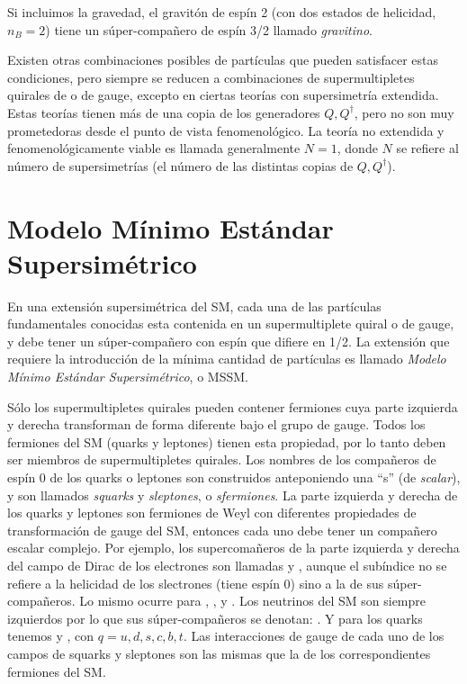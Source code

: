 Si incluimos la gravedad, el gravitón de espín 2 (con dos estados de helicidad,
$n_B=2$) tiene un súper-compañero de espín 3/2 llamado \emph{gravitino}.

Existen otras combinaciones posibles de partículas que pueden satisfacer estas
condiciones, pero siempre se reducen a combinaciones de supermultipletes
quirales de o de gauge, excepto en ciertas teorías con supersimetría extendida.
Estas teorías tienen más de una copia de los generadores $Q, Q^\dagger$, pero no
son muy prometedoras desde el punto de vista fenomenológico. La teoría no
extendida y fenomenológicamente viable es llamada generalmente $N=1$, donde $N$
se refiere al número de supersimetrías (el número de las distintas copias de
$Q,Q^\dagger$).


\section{Modelo Mínimo Estándar Supersimétrico}

En una extensión supersimétrica del SM, cada una de las partículas fundamentales
conocidas esta contenida en un supermultiplete quiral o de gauge, y debe tener
un súper-compa\~nero con espín que difiere en 1/2. La extensión que requiere la
introducción de la mínima cantidad de partículas es llamado \emph{Modelo Mínimo
  Estándar Supersimétrico}, o MSSM.


Sólo los supermultipletes quirales pueden contener fermiones cuya parte
izquierda y derecha transforman de forma diferente bajo el grupo de gauge. Todos
los fermiones del SM (quarks y leptones) tienen esta propiedad, por lo tanto
deben ser miembros de supermultipletes quirales. Los nombres de los compañeros
de espín 0 de los quarks o leptones son construidos anteponiendo una ``s'' (de
\emph{scalar}), y son llamados \emph{squarks} y \emph{sleptones}, o
\emph{sfermiones}. La parte izquierda y derecha de los quarks y leptones son
fermiones de Weyl con diferentes propiedades de transformación de gauge del SM,
entonces cada uno debe tener un compañero escalar complejo. Por ejemplo, los
supercomañeros de la parte izquierda y derecha del campo de Dirac de los
electrones son llamadas {\selL} y {\selR}, aunque el subíndice no se refiere a
la helicidad de los slectrones (tiene espín 0) sino a la de sus súper-compañeros.
Lo mismo ocurre para {\smuL}, {\smuR}, {\stauL} y {\stauR}. Los neutrinos del SM
son siempre izquierdos por lo que sus súper-compañeros se denotan: {\snu}. Y
para los quarks tenemos {\squarkL} y {\squarkR}, con $q = u, d, s, c, b, t$. Las
interacciones de gauge de cada uno de los campos de squarks y sleptones son las
mismas que la de los correspondientes fermiones del SM.

